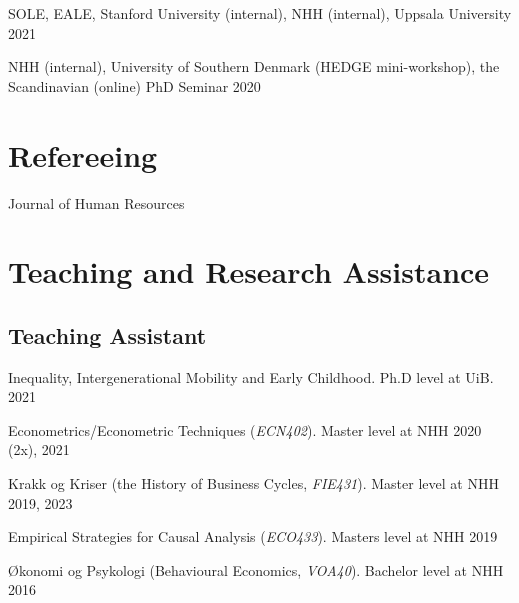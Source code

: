 \documentclass[11pt,]{article}
\begin{document}
SOLE, EALE, Stanford University (internal), NHH (internal), Uppsala
University \hfill 2021\vspace{-0.2cm}

NHH (internal), University of Southern Denmark (HEDGE mini-workshop),
the Scandinavian (online) PhD Seminar \hfill 2020\vspace{-0.2cm}

\vspace{0.5cm}

\hypertarget{refereeing}{%
\section{Refereeing}\label{refereeing}}

Journal of Human Resources\vspace{-0.2cm}

\vspace{0.5cm}

\hypertarget{teaching-and-research-assistance}{%
\section{Teaching and Research
Assistance}\label{teaching-and-research-assistance}}

\hypertarget{teaching-assistant}{%
\subsection{Teaching Assistant}\label{teaching-assistant}}

Inequality, Intergenerational Mobility and Early Childhood. Ph.D level
at UiB. \hfill 2021\vspace{-0.2cm}

Econometrics/Econometric Techniques (\emph{ECN402}). Master level at NHH
\hfill 2020 (2x), 2021\vspace{-0.2cm}

Krakk og Kriser (the History of Business Cycles, \emph{FIE431}). Master
level at NHH \hfill 2019, 2023\vspace{-0.2cm}

Empirical Strategies for Causal Analysis (\emph{ECO433}). Masters level
at NHH \hfill 2019\vspace{-0.2cm}

Økonomi og Psykologi (Behavioural Economics, \emph{VOA40}). Bachelor
level at NHH \hfill 2016\vspace{-0.2cm}

\vspace{0.5cm}
\end{document}
